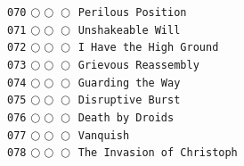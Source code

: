 \documentclass[a4paper,landscape]{article}
\begin{document}
\begin{multicols*}{5}
\texttt{070} \(\bigcirc\!\bigcirc\!\bigcirc\)  \texttt{Perilous Position} \vspace{-0.3mm}\\ 
\texttt{071} \(\bigcirc\!\bigcirc\!\bigcirc\)  \texttt{Unshakeable Will} \vspace{-0.3mm}\\ 
\texttt{072} \(\bigcirc\!\bigcirc\!\bigcirc\)  \texttt{I Have the High Ground} \vspace{-0.3mm}\\ 
\texttt{073} \(\bigcirc\!\bigcirc\!\bigcirc\)  \texttt{Grievous Reassembly} \vspace{-0.3mm}\\ 
\texttt{074} \(\bigcirc\!\bigcirc\!\bigcirc\)  \texttt{Guarding the Way} \vspace{-0.3mm}\\ 
\texttt{075} \(\bigcirc\!\bigcirc\!\bigcirc\)  \texttt{Disruptive Burst} \vspace{-0.3mm}\\ 
\texttt{076} \(\bigcirc\!\bigcirc\!\bigcirc\)  \texttt{Death by Droids} \vspace{-0.3mm}\\ 
\texttt{077} \(\bigcirc\!\bigcirc\!\bigcirc\)  \texttt{Vanquish} \vspace{-0.3mm}\\ 
\texttt{078} \(\bigcirc\!\bigcirc\!\bigcirc\)  \texttt{The Invasion of Christoph} \vspace{-0.3mm}\\ 

\end{multicols*}
\end{document}
